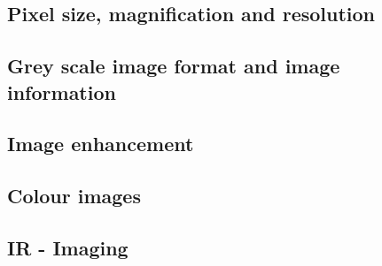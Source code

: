 \subsection{Pixel size, magnification and resolution}
\subsection{Grey scale image format and image information}
\subsection{Image enhancement}
\subsection{Colour images}
\subsection{IR - Imaging}



